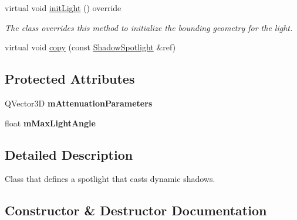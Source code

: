 \begin{DoxyCompactItemize}
virtual void \mbox{\hyperlink{class_geometry_engine_1_1_geometry_world_item_1_1_geometry_light_1_1_shadow_spotlight_a93e2c91b4377ecb98cf4c0409364c7be}{init\+Light}} () override
\begin{DoxyCompactList}\small\item\em The class overrides this method to initialize the bounding geometry for the light. \end{DoxyCompactList}\item 
virtual void \mbox{\hyperlink{class_geometry_engine_1_1_geometry_world_item_1_1_geometry_light_1_1_shadow_spotlight_a675183375855625b787de617239aa6fb}{copy}} (const \mbox{\hyperlink{class_geometry_engine_1_1_geometry_world_item_1_1_geometry_light_1_1_shadow_spotlight}{Shadow\+Spotlight}} \&ref)
\end{DoxyCompactItemize}
\subsection*{Protected Attributes}
\begin{DoxyCompactItemize}
\item 
\mbox{\label{class_geometry_engine_1_1_geometry_world_item_1_1_geometry_light_1_1_shadow_spotlight_abeddd80d127da40883c0cb9188b437c0}} 
Q\+Vector3D {\bfseries m\+Attenuation\+Parameters}
\item 
\mbox{\label{class_geometry_engine_1_1_geometry_world_item_1_1_geometry_light_1_1_shadow_spotlight_a163a904666af39fe7fc40be088c099a0}} 
float {\bfseries m\+Max\+Light\+Angle}
\end{DoxyCompactItemize}


\subsection{Detailed Description}
Class that defines a spotlight that casts dynamic shadows. 

\subsection{Constructor \& Destructor Documentation}
\mbox{\label{class_geometry_engine_1_1_geometry_world_item_1_1_geometry_light_1_1_shadow_spotlight_a449038886cf15c295c8f7445f2eb5c95}} 

